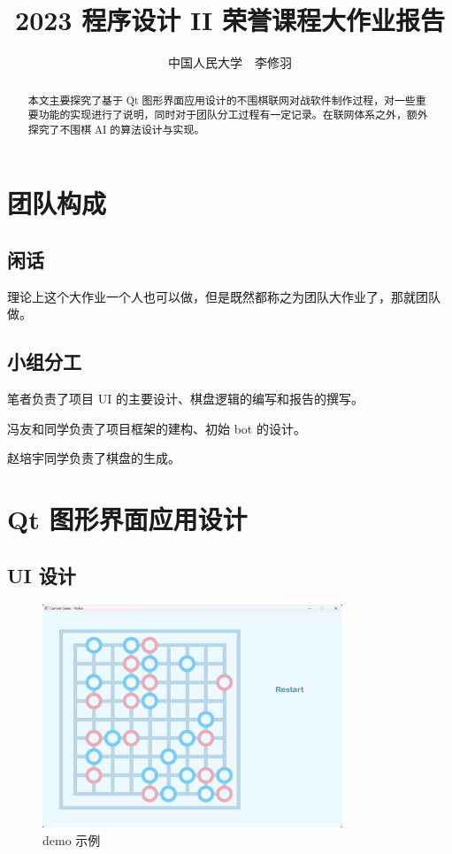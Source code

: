 \documentclass{noithesis}
\begin{document}
	
	\title{2023 程序设计 II 荣誉课程大作业报告}
	\author{中国人民大学~~李修羽}
	
	\maketitle
	
	\begin{abstract}
		本文主要探究了基于 Qt 图形界面应用设计的不围棋联网对战软件制作过程，对一些重要功能的实现进行了说明，同时对于团队分工过程有一定记录。在联网体系之外，额外探究了不围棋 AI 的算法设计与实现。
	\end{abstract}

	\tableofcontents
	\setcounter{page}{0}
	\thispagestyle{empty}
	\newpage
	
	\section{团队构成}
	
	\subsection{闲话}
	
	理论上这个大作业一个人也可以做，但是既然都称之为团队大作业了，那就团队做。
	
	\subsection{小组分工}
	
	笔者负责了项目 UI 的主要设计、棋盘逻辑的编写和报告的撰写。
	
	冯友和同学负责了项目框架的建构、初始 bot 的设计。
	
	赵培宇同学负责了棋盘的生成。
	
	\section{Qt 图形界面应用设计}
	
	
	\subsection{UI 设计}
	
	\begin{figure}[!htb]{
		\centering
		\includegraphics[width=0.8\textwidth]{img/UI.png}
		\caption{demo 示例}
	}
	\end{figure}
\end{document}
